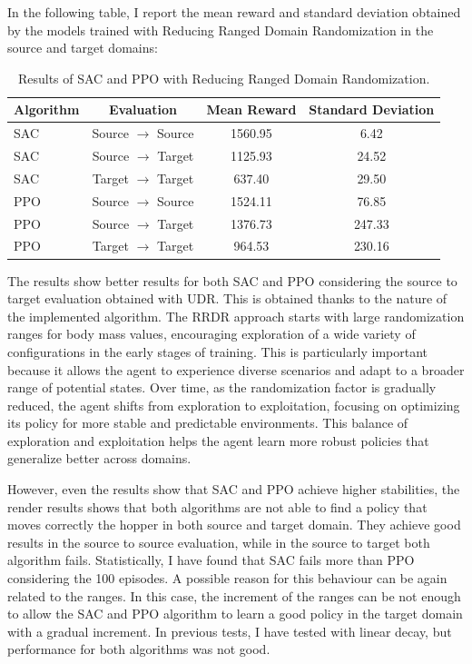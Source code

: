 \documentclass[12pt]{article}
\begin{document}
In the following table, I report the mean reward and standard deviation obtained by the models trained with Reducing Ranged Domain Randomization in the source and target domains:

\begin{table}[H]
    \centering
    \begin{tabular}{|l|c|c|c|}
        \hline
        \textbf{Algorithm} & \textbf{Evaluation} & \textbf{Mean Reward} & \textbf{Standard Deviation} \\ \hline
        SAC & Source $\rightarrow$ Source & 1560.95 & 6.42 \\ 
        SAC & Source $\rightarrow$ Target & 1125.93 & 24.52 \\ 
        SAC & Target $\rightarrow$ Target & 637.40 & 29.50 \\ \hline
        PPO & Source $\rightarrow$ Source & 1524.11 & 76.85 \\ 
        PPO & Source $\rightarrow$ Target & 1376.73 & 247.33 \\ 
        PPO & Target $\rightarrow$ Target & 964.53 & 230.16 \\ \hline
    \end{tabular}
    \caption{Results of SAC and PPO with Reducing Ranged Domain Randomization.}
    \label{tab:results_rrdr}
\end{table}

The results show better results for both SAC and PPO considering the source to target evaluation obtained with UDR. This is obtained thanks to the nature of the implemented algorithm. The RRDR approach starts with large randomization ranges for body mass values, encouraging exploration of a wide variety of configurations in the early stages of training. This is particularly important because it allows the agent to experience diverse scenarios and adapt to a broader range of potential states. Over time, as the randomization factor is gradually reduced, the agent shifts from exploration to exploitation, focusing on optimizing its policy for more stable and predictable environments. This balance of exploration and exploitation helps the agent learn more robust policies that generalize better across domains.

However, even the results show that SAC and PPO achieve higher stabilities, the render results shows that both algorithms are not able to find a policy that moves correctly the hopper in both source and target domain. They achieve good results in the source to source evaluation, while in the source to target both algorithm fails. Statistically, I have found that SAC fails more than PPO considering the 100 episodes. A possible reason for this behaviour can be again related to the ranges. In this case, the increment of the ranges can be not enough to allow the SAC and PPO algorithm to learn a good policy in the target domain with a gradual increment. In previous tests, I have tested with linear decay, but performance for both algorithms was not good.
\end{document}
